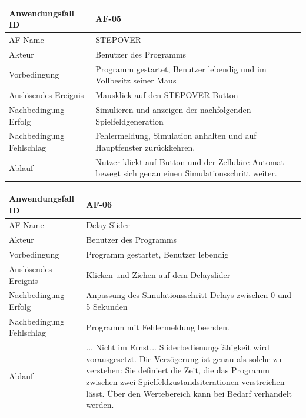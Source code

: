 \documentclass[11pt,a4paper]{article}
\begin{document}
\begin{tabular}[m]{|m{7cm}|m{9cm}|}
    \hline
    Anwendungsfall ID     & AF-05 \\
         \hline
    AF Name     &  STEPOVER \\
         \hline
    Akteur&Benutzer des Programms \\
    \hline
    Vorbedingung&Programm gestartet, Benutzer lebendig und im Vollbesitz seiner Maus\\
    \hline
    Auslösendes Ereignis&Mausklick auf den STEPOVER-Button\\
    \hline
    Nachbedingung Erfolg& Simulieren und anzeigen der nachfolgenden Spielfeldgeneration\\
    \hline
    Nachbedingung Fehlschlag&Fehlermeldung, Simulation anhalten und auf Hauptfenster zurückkehren.\\
    \hline
    Ablauf&Nutzer klickt auf Button und der Zelluläre Automat bewegt sich genau einen Simulationsschritt weiter.\\
    \hline
\end{tabular}
\par


\begin{tabular}[m]{|m{7cm}|m{9cm}|}
    \hline
    Anwendungsfall ID     & AF-06 \\
         \hline
    AF Name     &  Delay-Slider\\
         \hline
    Akteur&Benutzer des Programms \\
    \hline
    Vorbedingung&Programm gestartet, Benutzer lebendig\\
    \hline
    Auslösendes Ereignis&Klicken und Ziehen auf dem Delayslider\\
    \hline
    Nachbedingung Erfolg&Anpassung des Simulationsschritt-Delays zwischen 0 und 5 Sekunden\\
    \hline
    Nachbedingung Fehlschlag&Programm mit Fehlermeldung beenden.\\
    \hline
    Ablauf&... Nicht im Ernst... Sliderbedienungsfähigkeit wird vorausgesetzt. \newline Die Verzögerung ist genau als solche zu verstehen: Sie definiert die Zeit, die das Programm zwischen zwei Spielfeldzustandsiterationen verstreichen lässt. Über den Wertebereich kann bei Bedarf verhandelt werden.
    \\
    \hline
\end{tabular}
\par
\end{document}
